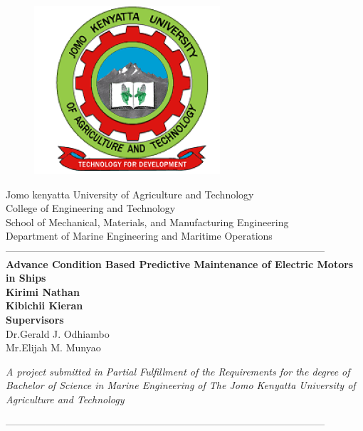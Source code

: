 \documentclass[12pt,fleqn]{article}
\begin{document}
\begin{titlepage}
  \begin{center}
      \vspace*{-4.0cm}
    \begin{figure}[!h]
\centering
\includegraphics[width=0.3\linewidth]{Figures/JKUAT_logo}
\end{figure}
   \large{Jomo kenyatta University of Agriculture and Technology}\\
    \large{College of Engineering and Technology}\\
    \large{School of Mechanical, Materials, and Manufacturing Engineering}\\
   \large{Department of Marine Engineering and Maritime Operations}\\

    ------------------------------------------------------------------------------------------------\\[0.2cm]
    \LARGE{\textbf{Advance Condition Based Predictive
    		Maintenance of Electric Motors in Ships}}\\[0.2cm]


 
     \large{\textbf{Kirimi Nathan}}\\[0.1cm]
     \large{\textbf{Kibichii Kieran}}\\[0.1cm]
     \large{\textbf{Supervisors}}\\
     \large{Dr.Gerald J. Odhiambo}\\
     \large{Mr.Elijah M. Munyao}
     \vspace{0.4cm}
     

   

   \textit{A project submitted in Partial Fulfillment of the Requirements for the degree of Bachelor of Science in Marine Engineering of The Jomo Kenyatta University of Agriculture and Technology}


    ------------------------------------------------------------------------------------------------\\[1.5cm]
  \end{center}
\end{titlepage}
%
\end{document}
